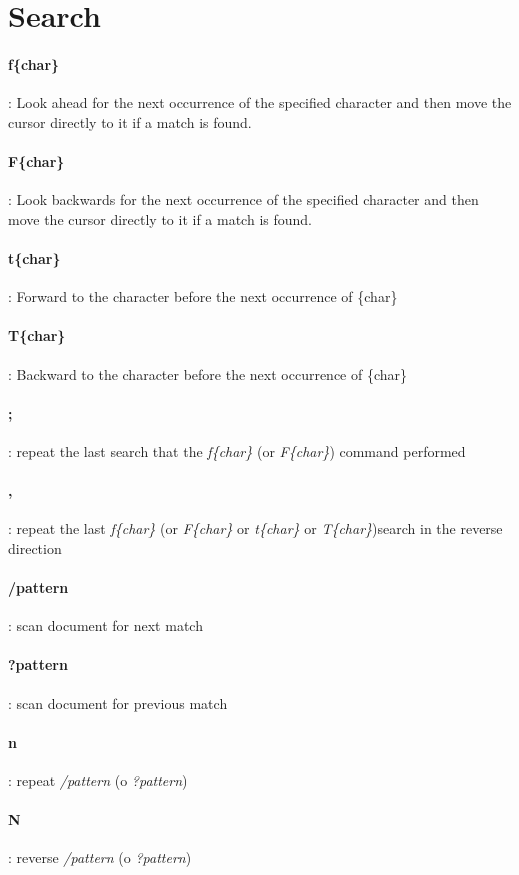 \documentclass[10pt,letterpaper]{book}
\begin{document}
\section{Search}
\paragraph{f\{char\}}: Look ahead for the next occurrence of the specified character and then move the cursor directly to it if a match is found.
\paragraph{F\{char\}}: Look backwards for the next occurrence of the specified character and then move the cursor directly to it if a match is found.
\paragraph{t\{char\}}: Forward to the character before the next occurrence of \{char\}
\paragraph{T\{char\}}: Backward to the character before the next occurrence of \{char\}
\paragraph{;}: repeat the last search that the \textit{f\{char\}} (or \textit{F\{char\}}) command performed
\paragraph{,}: repeat the last \textit{f\{char\}} (or \textit{F\{char\}} or \textit{t\{char\}} or \textit{T\{char\}})search in the reverse direction
\paragraph{/pattern}: scan document for next match
\paragraph{?pattern}: scan document for previous match
\paragraph{n}: repeat \textit{/pattern} (o \textit{?pattern})
\paragraph{N}: reverse \textit{/pattern} (o \textit{?pattern})
\end{document}
